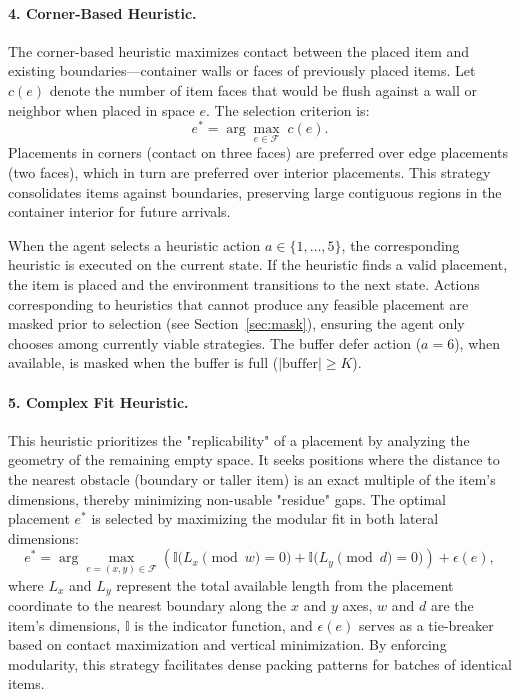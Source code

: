 \documentclass[runningheads]{llncs}
\begin{document}
\paragraph{4. Corner-Based Heuristic.}
The corner-based heuristic maximizes contact between the placed item and existing boundaries---container walls or faces of previously placed items. Let $c(e)$ denote the number of item faces that would be flush against a wall or neighbor when placed in space $e$. The selection criterion is:
\begin{equation}
    e^* = \arg\max_{e \in \mathcal{F}} \; c(e).
\end{equation}
Placements in corners (contact on three faces) are preferred over edge placements (two faces), which in turn are preferred over interior placements. This strategy consolidates items against boundaries, preserving large contiguous regions in the container interior for future arrivals.

When the agent selects a heuristic action $a \in \{1, \dots, 5\}$, the corresponding heuristic is executed on the current state. If the heuristic finds a valid placement, the item is placed and the environment transitions to the next state. Actions corresponding to heuristics that cannot produce any feasible placement are masked prior to selection (see Section~\ref{sec:mask}), ensuring the agent only chooses among currently viable strategies. The buffer defer action ($a = 6$), when available, is masked when the buffer is full ($|\text{buffer}| \geq K$).

\paragraph{5. Complex Fit Heuristic.}
This heuristic prioritizes the "replicability" of a placement by analyzing the geometry of the remaining empty space. It seeks positions where the distance to the nearest obstacle (boundary or taller item) is an exact multiple of the item's dimensions, thereby minimizing non-usable "residue" gaps. The optimal placement $e^*$ is selected by maximizing the modular fit in both lateral dimensions:
\begin{equation}
e^* = \arg\max_{e=(x,y) \in \mathcal{F}} \left( \mathbb{I}\big(L_x \pmod w = 0\big) + \mathbb{I}\big(L_y \pmod d = 0\big) \right) + \epsilon(e),
\end{equation}
where $L_x$ and $L_y$ represent the total available length from the placement coordinate to the nearest boundary along the $x$ and $y$ axes, $w$ and $d$ are the item's dimensions, $\mathbb{I}$ is the indicator function, and $\epsilon(e)$ serves as a tie-breaker based on contact maximization and vertical minimization. By enforcing modularity, this strategy facilitates dense packing patterns for batches of identical items.
\end{document}
